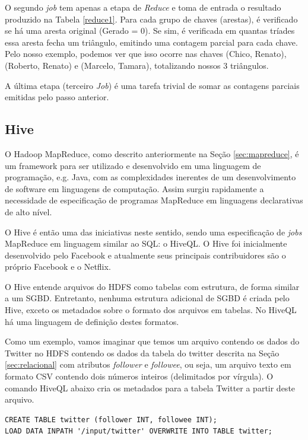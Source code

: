 O segundo \textit{job} tem apenas a etapa de \textit{Reduce} e toma de entrada o resultado produzido na 
Tabela \ref{reduce1}. Para cada grupo de chaves (arestas), é verificado se há uma aresta original 
(Gerado = 0). Se sim, é verificada em quantas tríades essa aresta fecha um triângulo, emitindo uma 
contagem parcial para cada chave. Pelo nosso exemplo, podemos ver que isso ocorre nas chaves 
(Chico, Renato), (Roberto, Renato) e (Marcelo, Tamara), totalizando nossos 3 triângulos.

A última etapa (terceiro \textit{Job}) é uma tarefa trivial de somar as contagens parciais emitidas 
pelo passo anterior.

\subsection{Hive}

O Hadoop MapReduce, como descrito anteriormente na Seção \ref{sec:mapreduce}, é um framework para ser 
utilizado e desenvolvido em uma linguagem de programação, e.g. Java, com as complexidades inerentes de 
um desenvolvimento de software em linguagens de computação. Assim surgiu rapidamente a necessidade de 
especificação de programas MapReduce em linguagens declarativas de alto nível.

O Hive \citep{thusoo2009hive} é então uma das iniciativas neste sentido, sendo uma especificação de 
\textit{jobs} MapReduce em linguagem similar ao SQL: o HiveQL. O Hive foi inicialmente desenvolvido 
pelo Facebook e atualmente seus principais contribuidores são o próprio Facebook e o Netflix.

O Hive entende arquivos do HDFS como tabelas com estrutura, de forma similar a um SGBD. Entretanto, 
nenhuma estrutura adicional de SGBD é criada pelo Hive, exceto os metadados sobre o formato dos arquivos 
em tabelas. No HiveQL há uma linguagem de definição destes formatos.

Como um exemplo, vamos imaginar que temos um arquivo contendo os dados do Twitter no HDFS contendo 
os dados da tabela do twitter descrita na Seção \ref{sec:relacional} com atributos \textit{follower} e
\textit{followee}, ou seja, um arquivo texto em formato CSV contendo dois números inteiros (delimitados
por vírgula). O comando HiveQL abaixo cria os metadados para a tabela Twitter a partir deste arquivo.

\begin{verbatim}
CREATE TABLE twitter (follower INT, followee INT);
LOAD DATA INPATH '/input/twitter' OVERWRITE INTO TABLE twitter;
\end{verbatim}

